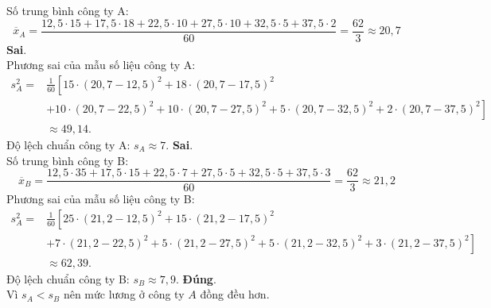 \begin{ex}
{\begin{itemchoice}
			Số trung bình công ty A:
			$$\overline{x}_A=\dfrac{12{,}5\cdot 15+17{,}5\cdot 18+22{,}5\cdot 10+27{,}5\cdot 10+32{,}5\cdot 5+37{,}5\cdot 2}{60}=\dfrac{62}{3}\approx 20{,}7$$
			\itemch \textbf{Sai}.\\
			Phương sai của mẫu số liệu công ty A:
			$$
			\begin{aligned}
				s^2_A  =&\frac{1}{60}\left[15\cdot(20{,}7-12{,}5)^2+18\cdot(20{,}7-17{,}5)^2\right. \\
				& +10\cdot(20{,}7-22{,}5)^2+10\cdot(20{,}7-27{,}5)^2+5\cdot(20{,}7-32{,}5)^2+2\cdot(20{,}7-37{,}5)^2 \left. \right]\\
				&  \approx 49{,}14.
			\end{aligned}
			$$
			Độ lệch chuẩn công ty A: $s_A\approx 7$.
			\itemch \textbf{Sai}.\\
			Số trung bình công ty B:
			$$\overline{x}_B=\dfrac{12{,}5\cdot 35+17{,}5\cdot 15+22{,}5\cdot 7+27{,}5\cdot 5+32{,}5\cdot 5+37{,}5\cdot 3}{60}=\dfrac{62}{3}\approx 21{,}2$$
			Phương sai của mẫu số liệu công ty B:
			$$
			\begin{aligned}
				s^2_A  =&\frac{1}{60}\left[25\cdot(21{,}2-12{,}5)^2+15\cdot(21{,}2-17{,}5)^2\right. \\
				& +7\cdot(21{,}2-22{,}5)^2+5\cdot(21{,}2-27{,}5)^2+5\cdot(21{,}2-32{,}5)^2+3\cdot(21{,}2-37{,}5)^2 \left. \right]\\
				&  \approx 62{,}39.
			\end{aligned}
			$$
			Độ lệch chuẩn công ty B: $s_B\approx 7{,}9$.
			\itemch \textbf{Đúng}.\\
			Vì $s_A<s_B$ nên mức lương ở công ty $A$ đồng đều hơn.
		\end{itemchoice}	
	}
\end{ex}

